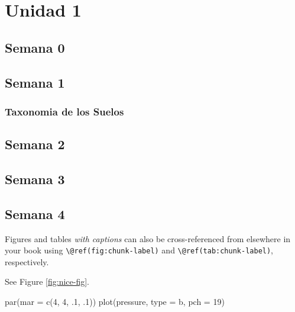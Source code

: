 \documentclass[
]{book}
\newenvironment{Shaded}{\begin{snugshade}}{\end{snugshade}}
\newcommand{\AttributeTok}[1]{\textcolor[rgb]{0.77,0.63,0.00}{#1}}
\newcommand{\DecValTok}[1]{\textcolor[rgb]{0.00,0.00,0.81}{#1}}
\newcommand{\FunctionTok}[1]{\textcolor[rgb]{0.00,0.00,0.00}{#1}}
\newcommand{\NormalTok}[1]{#1}
\newcommand{\StringTok}[1]{\textcolor[rgb]{0.31,0.60,0.02}{#1}}
\begin{document}
\hypertarget{unidad-1}{%
\section*{Unidad 1}\label{unidad-1}}

\hypertarget{semana-0}{%
\subsection*{Semana 0}\label{semana-0}}

\hypertarget{semana-1}{%
\subsection*{Semana 1}\label{semana-1}}

\hypertarget{taxonomia-de-los-suelos}{%
\subsubsection*{Taxonomia de los Suelos}\label{taxonomia-de-los-suelos}}

\hypertarget{semana-2}{%
\subsection*{Semana 2}\label{semana-2}}

\hypertarget{semana-3}{%
\subsection*{Semana 3}\label{semana-3}}

\hypertarget{semana-4}{%
\subsection*{Semana 4}\label{semana-4}}

Figures and tables \emph{with captions} can also be cross-referenced from elsewhere in your book using \texttt{\textbackslash{}@ref(fig:chunk-label)} and \texttt{\textbackslash{}@ref(tab:chunk-label)}, respectively.

See Figure \ref{fig:nice-fig}.

\begin{Shaded}
\begin{Highlighting}[]
\FunctionTok{par}\NormalTok{(}\AttributeTok{mar =} \FunctionTok{c}\NormalTok{(}\DecValTok{4}\NormalTok{, }\DecValTok{4}\NormalTok{, .}\DecValTok{1}\NormalTok{, .}\DecValTok{1}\NormalTok{))}
\FunctionTok{plot}\NormalTok{(pressure, }\AttributeTok{type =} \StringTok{\textquotesingle{}b\textquotesingle{}}\NormalTok{, }\AttributeTok{pch =} \DecValTok{19}\NormalTok{)}
\end{Highlighting}
\end{Shaded}
\end{document}
